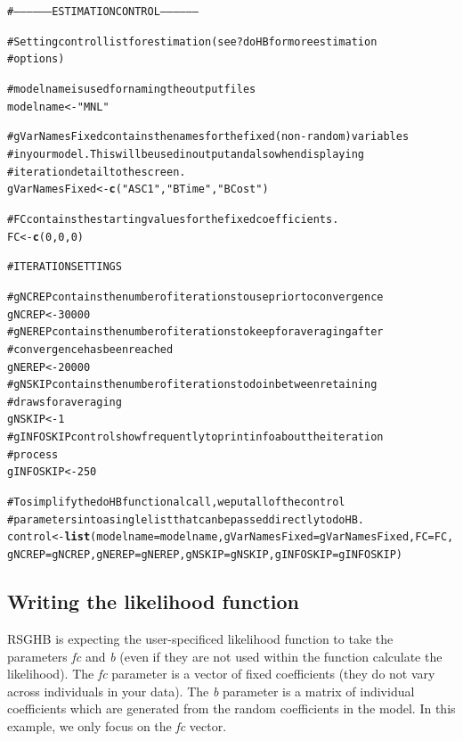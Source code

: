 \documentclass{article}\usepackage{graphicx, color}
\makeatletter
\newcommand{\hlfunctioncall}[1]{\textcolor[rgb]{0.501960784313725,0,0.329411764705882}{\textbf{#1}}}%
\newcommand{\hlstring}[1]{\textcolor[rgb]{0.6,0.6,1}{#1}}%
\newcommand{\hlcomment}[1]{\textcolor[rgb]{0.180392156862745,0.6,0.341176470588235}{#1}}%
\newenvironment{kframe}{%
 \def\at@end@of@kframe{}%
 \ifinner\ifhmode%
  \def\at@end@of@kframe{\end{minipage}}%
  \begin{minipage}{\columnwidth}%
 \fi\fi%
 \def\FrameCommand##1{\hskip\@totalleftmargin \hskip-\fboxsep
 \colorbox{shadecolor}{##1}\hskip-\fboxsep
     \hskip-\linewidth \hskip-\@totalleftmargin \hskip\columnwidth}%
 \MakeFramed {\advance\hsize-\width
   \@totalleftmargin\z@ \linewidth\hsize
   \@setminipage}}%
 {\par\unskip\endMakeFramed%
 \at@end@of@kframe}
\newenvironment{knitrout}{}{} %
\makeatother
\begin{document}
\begin{knitrout}
\color{fgcolor}\begin{kframe}
\begin{alltt}

\hlcomment{# ------------------ ESTIMATION CONTROL ------------------}

\hlcomment{# Setting control list for estimation (see ?doHB for more estimation}
\hlcomment{# options)}

\hlcomment{# modelname is used for naming the output files}
modelname <- \hlstring{"MNL"}

\hlcomment{# gVarNamesFixed contains the names for the fixed (non-random) variables}
\hlcomment{# in your model. This will be used in output and also when displaying}
\hlcomment{# iteration detail to the screen.}
gVarNamesFixed <- \hlfunctioncall{c}(\hlstring{"ASC1"}, \hlstring{"BTime"}, \hlstring{"BCost"})

\hlcomment{# FC contains the starting values for the fixed coefficients.}
FC <- \hlfunctioncall{c}(0, 0, 0)

\hlcomment{# ITERATION SETTINGS}

\hlcomment{# gNCREP contains the number of iterations to use prior to convergence}
gNCREP <- 30000
\hlcomment{# gNEREP contains the number of iterations to keep for averaging after}
\hlcomment{# convergence has been reached}
gNEREP <- 20000
\hlcomment{# gNSKIP contains the number of iterations to do in between retaining}
\hlcomment{# draws for averaging}
gNSKIP <- 1
\hlcomment{# gINFOSKIP controls how frequently to print info about the iteration}
\hlcomment{# process}
gINFOSKIP <- 250

\hlcomment{# To simplify the doHB functional call, we put all of the control}
\hlcomment{# parameters into a single list that can be passed directly to doHB.}
control <- \hlfunctioncall{list}(modelname = modelname, gVarNamesFixed = gVarNamesFixed, FC = FC, 
    gNCREP = gNCREP, gNEREP = gNEREP, gNSKIP = gNSKIP, gINFOSKIP = gINFOSKIP)
\end{alltt}
\end{kframe}
\end{knitrout}


\subsection*{Writing the likelihood function}

RSGHB is expecting the user-specificed likelihood function to take the parameters \emph{fc} and \emph{b} (even if they are not used within the function calculate the likelihood). The \emph{fc} parameter is a vector of fixed coefficients (they do not vary across individuals in your data). The \emph{b} parameter is a matrix of individual coefficients which are generated from the random coefficients in the model. In this example, we only focus on the \emph{fc} vector.
\end{document}
